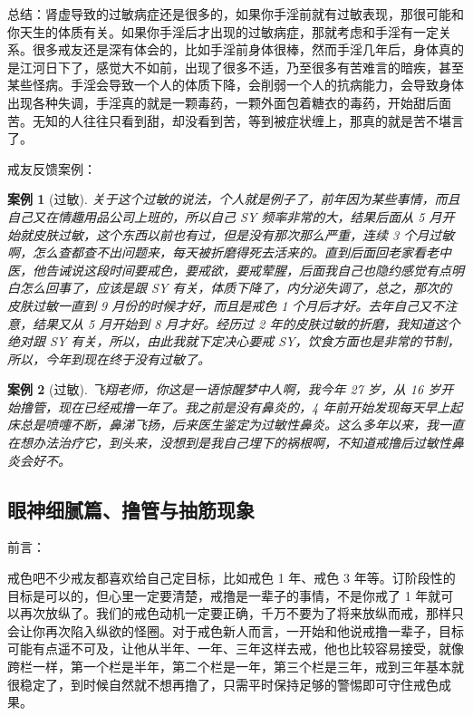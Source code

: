 \documentclass{ctexart}
\newtheorem{case}{案例}
\begin{document}
总结：肾虚导致的过敏病症还是很多的，如果你手淫前就有过敏表现，那很可能和你天生的体质有关。如果你手淫后才出现的过敏病症，那就考虑和手淫有一定关系。很多戒友还是深有体会的，比如手淫前身体很棒，然而手淫几年后，身体真的是江河日下了，感觉大不如前，出现了很多不适，乃至很多有苦难言的暗疾，甚至某些怪病。手淫会导致一个人的体质下降，会削弱一个人的抗病能力，会导致身体出现各种失调，手淫真的就是一颗毒药，一颗外面包着糖衣的毒药，开始甜后面苦。无知的人往往只看到甜，却没看到苦，等到被症状缠上，那真的就是苦不堪言了。

戒友反馈案例：

\begin{case}[过敏]
    关于这个过敏的说法，个人就是例子了，前年因为某些事情，而且自己又在情趣用品公司上班的，所以自己 SY 频率非常的大，结果后面从 5 月开始就皮肤过敏，这个东西以前也有过，但是没有那次那么严重，连续 3 个月过敏啊，怎么查都查不出问题来，每天被折磨得死去活来的。直到后面回老家看老中医，他告诫说这段时间要戒色，要戒欲，要戒荤腥，后面我自己也隐约感觉有点明白怎么回事了，应该是跟 SY 有关，体质下降了，内分泌失调了，总之，那次的皮肤过敏一直到 9 月份的时候才好，而且是戒色 1 个月后才好。去年自己又不注意，结果又从 5 月开始到 8 月才好。经历过 2 年的皮肤过敏的折磨，我知道这个绝对跟 SY 有关，所以，由此我就下定决心要戒 SY，饮食方面也是非常的节制，所以，今年到现在终于没有过敏了。
\end{case}

\begin{case}[过敏]
    飞翔老师，你这是一语惊醒梦中人啊，我今年 27 岁，从 16 岁开始撸管，现在已经戒撸一年了。我之前是没有鼻炎的，4 年前开始发现每天早上起床总是喷嚏不断，鼻涕飞扬，后来医生鉴定为过敏性鼻炎。这么多年以来，我一直在想办法治疗它，到头来，没想到是我自己埋下的祸根啊，不知道戒撸后过敏性鼻炎会好不。
\end{case}

\subsection{眼神细腻篇、撸管与抽筋现象}

前言：

戒色吧不少戒友都喜欢给自己定目标，比如戒色 1 年、戒色 3 年等。订阶段性的目标是可以的，但心里一定要清楚，戒撸是一辈子的事情，不是你戒了 1 年就可以再次放纵了。我们的戒色动机一定要正确，千万不要为了将来放纵而戒，那样只会让你再次陷入纵欲的怪圈。对于戒色新人而言，一开始和他说戒撸一辈子，目标可能有点遥不可及，让他从半年、一年、三年这样去戒，他也比较容易接受，就像跨栏一样，第一个栏是半年，第二个栏是一年，第三个栏是三年，戒到三年基本就很稳定了，到时候自然就不想再撸了，只需平时保持足够的警惕即可守住戒色成果。
\end{document}
